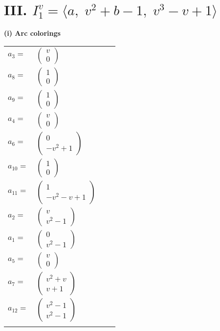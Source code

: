 \documentclass[1p]{elsarticle_modified}
\theoremstyle{definition}
\begin{document}
\centering \section*{III. $I^v_{1}= \langle a,\;v^2+b-1,\;v^3- v+1 \rangle$}
\flushleft \textbf{(i) Arc colorings}\\
\begin{tabular}{m{7pt} m{180pt} m{7pt} m{180pt} }
\flushright $a_{3}=$&$\begin{pmatrix}v\\0\end{pmatrix}$ \\
\flushright $a_{8}=$&$\begin{pmatrix}1\\0\end{pmatrix}$ \\
\flushright $a_{9}=$&$\begin{pmatrix}1\\0\end{pmatrix}$ \\
\flushright $a_{4}=$&$\begin{pmatrix}v\\0\end{pmatrix}$ \\
\flushright $a_{6}=$&$\begin{pmatrix}0\\- v^2+1\end{pmatrix}$ \\
\flushright $a_{10}=$&$\begin{pmatrix}1\\0\end{pmatrix}$ \\
\flushright $a_{11}=$&$\begin{pmatrix}1\\- v^2- v+1\end{pmatrix}$ \\
\flushright $a_{2}=$&$\begin{pmatrix}v\\v^2-1\end{pmatrix}$ \\
\flushright $a_{1}=$&$\begin{pmatrix}0\\v^2-1\end{pmatrix}$ \\
\flushright $a_{5}=$&$\begin{pmatrix}v\\0\end{pmatrix}$ \\
\flushright $a_{7}=$&$\begin{pmatrix}v^2+v\\v+1\end{pmatrix}$ \\
\flushright $a_{12}=$&$\begin{pmatrix}v^2-1\\v^2-1\end{pmatrix}$\\&\end{tabular}
\end{document}
